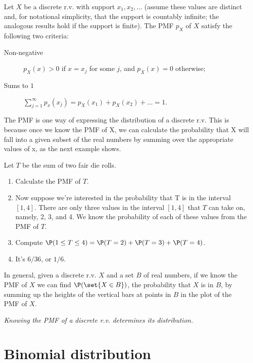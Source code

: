 \documentclass{ccg-topic}
\begin{document}
\begin{thm}
    \label{thm:valid_probability_mass_functions}
    Let $X$ be a discrete r.v. with support $x_1, x_2, \ldots$ (assume these values are distinct and, for notational simplicity, that the support is countably infinite; the analogous results hold if the support is finite). 
The PMF $p_X$ of $X$  satisfy the following two criteria:
\begin{description}
    \item [Non-negative] $p_X(x) > 0$ if $x = x_j$ for some $j$, and $p_X(x) = 0$ otherwise;
\item [Sums to $1$] $\sum\limits_{j=1}^{\infty} p_x(x_j) = p_X(x_1) + p_X(x_2) + \ldots = 1$.
\end{description}

\end{thm} 

The PMF is one way of expressing the distribution of a discrete r.v. This is because once we know the PMF of X, we can calculate the probability that X will fall into a given subset of the real numbers by summing over the appropriate values of x, as the next example shows.

\begin{ex}
    \label{ex:sum_of_two_fair_die_rolls}
    Let $T$ be the sum of two fair die rolls.
\begin{enumerate}
    \item Calculate the PMF of $T$.
\item Now suppose we’re interested in the probability that T is in the interval $[1, 4]$. There are only three values in the interval $[1, 4]$ that $T$ can take on, namely, 2, 3, and 4. We know the probability of each of these values from the PMF of $T$.
\item Compute $\P(1 \le T \le 4) = \P(T = 2) + \P(T=3) + \P(T=4)$.
\item It's $6/36$, or $1/6$.
\end{enumerate}
\end{ex}

In general, given a discrete r.v. $X$ and a set $B$ of real numbers, if we know the PMF of $X$ we can find $\P(\set{X \in B})$, the probability that $X$ is in $B$, by summing up the heights of the vertical bars at points in $B$ in the plot of the PMF of $X$. 

\emph{Knowing the PMF of a discrete r.v. determines its distribution.}

\section{Binomial distribution}
\end{document}
